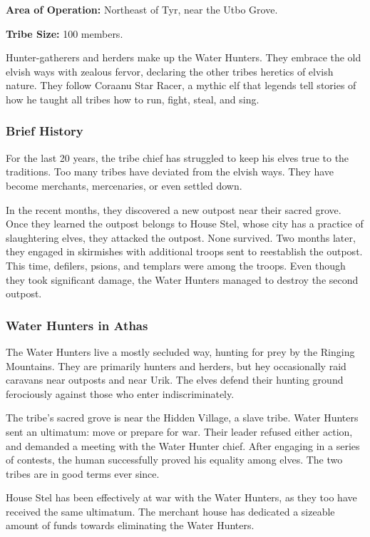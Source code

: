\textbf{Area of Operation:} Northeast of Tyr, near the Utbo Grove.

\textbf{Tribe Size:} 100 members.

Hunter-gatherers and herders make up the Water Hunters. They embrace the old elvish ways with zealous fervor, declaring the other tribes heretics of elvish nature. They follow Coraanu Star Racer, a mythic elf that legends tell stories of how he taught all tribes how to run, fight, steal, and sing.

\subsubsection{Brief History}
For the last 20 years, the tribe chief has struggled to keep his elves true to the traditions. Too many tribes have deviated from the elvish ways. They have become merchants, mercenaries, or even settled down.

In the recent months, they discovered a new outpost near their sacred grove. Once they learned the outpost belongs to House Stel, whose city has a practice of slaughtering elves, they attacked the outpost. None survived. Two months later, they engaged in skirmishes with additional troops sent to reestablish the outpost. This time, defilers, psions, and templars were among the troops. Even though they took significant damage, the Water Hunters managed to destroy the second outpost.

\subsubsection{Water Hunters in Athas}
The Water Hunters live a mostly secluded way, hunting for prey by the Ringing Mountains. They are primarily hunters and herders, but hey occasionally raid caravans near outposts and near Urik. The elves defend their hunting ground ferociously against those who enter indiscriminately.

The tribe's sacred grove is near the Hidden Village, a slave tribe. Water Hunters sent an ultimatum: move or prepare for war. Their leader refused either action, and demanded a meeting with the Water Hunter chief. After engaging in a series of contests, the human successfully proved his equality among elves. The two tribes are in good terms ever since.

House Stel has been effectively at war with the Water Hunters, as they too have received the same ultimatum. The merchant house has dedicated a sizeable amount of funds towards eliminating the Water Hunters.

